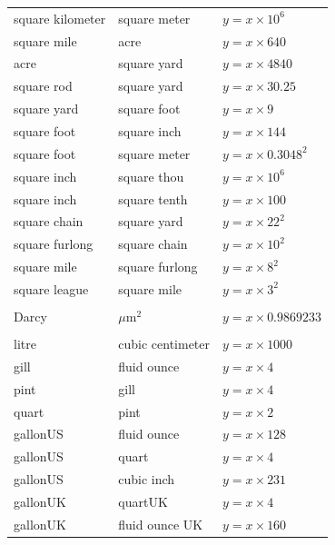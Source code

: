 \documentclass[11pt,a4paper]{report}
\begin{document}
{\begin{longtable}{l l l}
\midrule
square kilometer  & square meter      & $y = x \times 10^{6}$ \\
square mile       & acre              & $y = x \times 640$ \\
acre              & square yard       & $y = x \times 4840$ \\
square rod        & square yard       & $y = x \times 30.25$ \\
square yard       & square foot       & $y = x \times 9$ \\
square foot       & square inch       & $y = x \times 144$ \\
square foot       & square meter      & $y = x \times 0.3048^{2}$ \\
square inch       & square thou       & $y = x \times 10^{6}$ \\
square inch       & square tenth      & $y = x \times 100$ \\
square chain      & square yard       & $y = x \times 22^{2}$ \\
square furlong    & square chain      & $y = x \times 10^{2}$ \\
square mile       & square furlong    & $y = x \times 8^{2}$ \\
square league     & square mile       & $y = x \times 3^{2}$ \\
\addlinespace
\multicolumn{3}{l}{\textbf{Permeability}} \\
\midrule
Darcy             & $\mu\text{m}^2$  & $y = x \times 0.9869233$ \\
\addlinespace
\multicolumn{3}{l}{\textbf{Volume}} \\
\midrule
litre             & cubic centimeter  & $y = x \times 1000$ \\
gill              & fluid ounce       & $y = x \times 4$ \\
pint              & gill              & $y = x \times 4$ \\
quart             & pint              & $y = x \times 2$ \\
gallonUS          & fluid ounce       & $y = x \times 128$ \\
gallonUS          & quart             & $y = x \times 4$ \\
gallonUS          & cubic inch        & $y = x \times 231$ \\
gallonUK          & quartUK           & $y = x \times 4$ \\
gallonUK          & fluid ounce UK    & $y = x \times 160$ \\

\end{longtable}}
\end{document}
